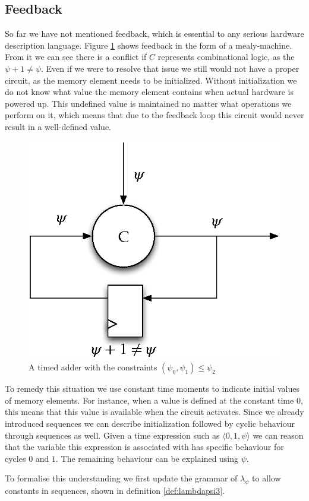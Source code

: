 \subsection{Feedback}
So far we have not mentioned feedback, which is essential to any serious hardware description language.
Figure \ref{fig:feedbacktime} shows feedback in the form of a mealy-machine.
From it we can see there is a conflict if $C$ represents combinational logic, as the $\psi + 1 \neq \psi$.
Even if we were to resolve that issue we still would not have a proper circuit, as the memory element needs to be initialized.
Without initialization we do not know what value the memory element contains when actual hardware is powered up.
This undefined value is maintained no matter what operations we perform on it, which means that due to the feedback loop this circuit would never result in a well-defined value.

\begin{figure}[h]
\centering
\includegraphics[width=0.5\linewidth]{images/feedback}
\caption{A timed adder with the constraints $(\psi_0,\psi_1) \le \psi_2$}
\label{fig:feedbacktime}
\end{figure}

To remedy this situation we use constant time moments to indicate initial values of memory elements.
For instance, when a value is defined at the constant time $0$, this means that this value is available when the circuit activates.
Since we already introduced sequences we can describe initialization followed by cyclic behaviour through sequences as well.
Given a time expression such as $\langle 0,1,\psi \rangle$ we can reason that the variable this expression is associated with has specific behaviour for cycles $0$ and $1$.
The remaining behaviour can be explained using $\psi$.

To formalise this understanding we first update the grammar of $\lambda_\psi$ to allow constants in sequences, shown in definition \ref{def:lambdapsi3}.

